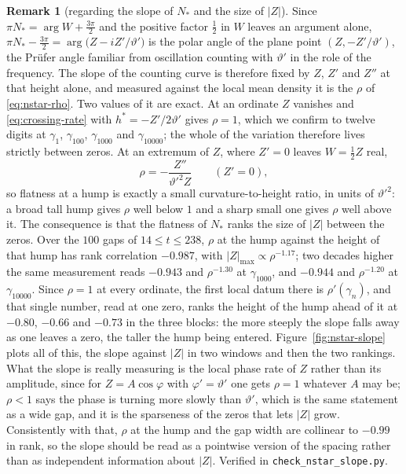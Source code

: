 \documentclass[11pt]{article}
\theoremstyle{definition}
\newtheorem{remark}[theorem]{Remark}
\begin{document}
\begin{remark}[regarding the slope of $N_{\ast}$ and the size of $|Z|$]
\label{rem:nstar-slope}
Since $\pi N_{\ast}=\arg W+\tfrac{3\pi}{2}$ and the positive factor $\tfrac12$
in $W$ leaves an argument alone,
$\pi N_{\ast}-\tfrac{3\pi}{2}=\arg\bigl(Z-iZ'/\vartheta'\bigr)$ is the polar angle
of the plane point $(Z,-Z'/\vartheta')$, the Pr\"ufer angle familiar from
oscillation counting with $\vartheta'$ in the role of the frequency. The slope of
the counting curve is therefore fixed by $Z$, $Z'$ and $Z''$ at that height
alone, and measured against the local mean density it is the
$\rho$ of \eqref{eq:nstar-rho}. Two values of it are exact. At an ordinate $Z$ vanishes and
\eqref{eq:crossing-rate} with $h^{\ast}=-Z'/2\vartheta'$ gives $\rho=1$, which we
confirm to twelve digits at $\gamma_1$, $\gamma_{100}$, $\gamma_{1000}$ and
$\gamma_{10000}$; the whole of the variation therefore lives strictly between
zeros. At an extremum of $Z$, where $Z'=0$ leaves $W=\tfrac12 Z$ real,
\begin{equation}\label{eq:rho-peak}
\rho=-\frac{Z''}{\vartheta'^2 Z}\qquad(Z'=0),
\end{equation}
so flatness at a hump is exactly a small curvature-to-height ratio, in units of
$\vartheta'^2$: a broad tall hump gives $\rho$ well below $1$ and a sharp small one
gives $\rho$ well above it. The consequence is that the flatness of
$N_{\ast}$ ranks the size of $|Z|$ between the zeros. Over the $100$ gaps of
$14\leq t\leq238$, $\rho$ at the hump against the height of that hump has rank
correlation $-0.987$, with $|Z|_{\max}\propto\rho^{-1.17}$; two decades higher
the same measurement reads $-0.943$ and $\rho^{-1.30}$ at
$\gamma_{1000}$, and $-0.944$ and $\rho^{-1.20}$ at $\gamma_{10000}$. Since
$\rho=1$ at every ordinate, the first local datum there is $\rho'(\gamma_n)$,
and that single number, read at one zero, ranks the height of the hump ahead of
it at $-0.80$, $-0.66$ and $-0.73$ in the three blocks: the more steeply the
slope falls away as one leaves a zero, the taller the hump being entered.
Figure~\ref{fig:nstar-slope} plots all of this, the slope against $|Z|$ in two
windows and then the two rankings. What the slope is really
measuring is the local phase rate of $Z$ rather than its amplitude, since for
$Z=A\cos\varphi$ with $\varphi'=\vartheta'$ one gets $\rho=1$ whatever $A$ may be;
$\rho<1$ says the phase is turning more slowly than $\vartheta'$, which is the same
statement as a wide gap, and it is the sparseness of the zeros that lets $|Z|$
grow. Consistently with that, $\rho$ at the hump and the gap width are
collinear to $-0.99$ in rank, so the slope should be read as a pointwise
version of the spacing rather than as independent information about $|Z|$.
Verified in \texttt{check\_nstar\_slope.py}.
\end{remark}
\end{document}
